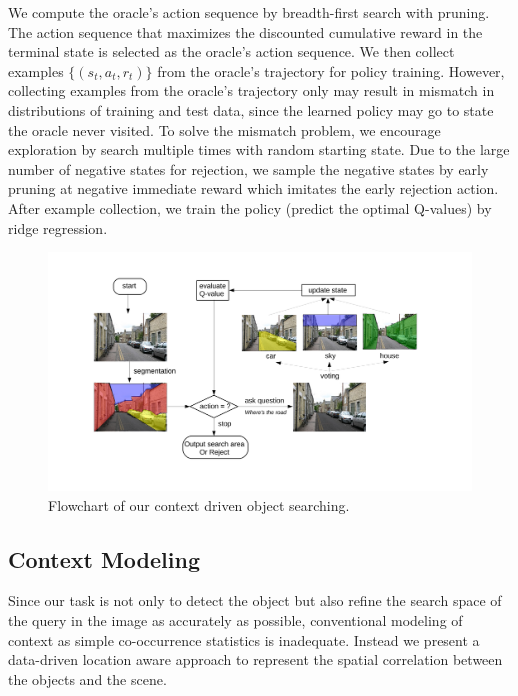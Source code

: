We compute the oracle's action sequence by breadth-first
search with pruning. The action sequence that maximizes the discounted
cumulative reward in the terminal state is selected as the oracle's action
sequence.
We then collect examples $\{(s_t,a_t,r_t)\}$ from the oracle's trajectory for
policy training.
However, collecting examples from the oracle's trajectory
only may result in mismatch in distributions of training and test data, since
the learned policy may go to state the oracle never visited.
To solve the mismatch problem, we encourage exploration by search multiple
times with random starting state.  Due to the large number of negative states for rejection, we sample the negative states by early pruning at negative immediate reward which imitates the early rejection action. After example collection, we train the policy (predict the optimal Q-values) by
ridge regression.

\begin{figure}[htb]
\begin{center}
\includegraphics[width=\linewidth]{figures/flowchart_Q.pdf}
\caption{Flowchart of our context driven object searching. %
}
\label{fig:flowchart}
\end{center}
\end{figure}

\subsection{Context Modeling}
\label{sec:context}
Since our task is not only to detect the object but also refine the search space of the query in the image as accurately as possible, conventional modeling of context as simple co-occurrence statistics is inadequate. Instead we present a data-driven location aware approach to represent the spatial correlation between the objects and the scene. 

